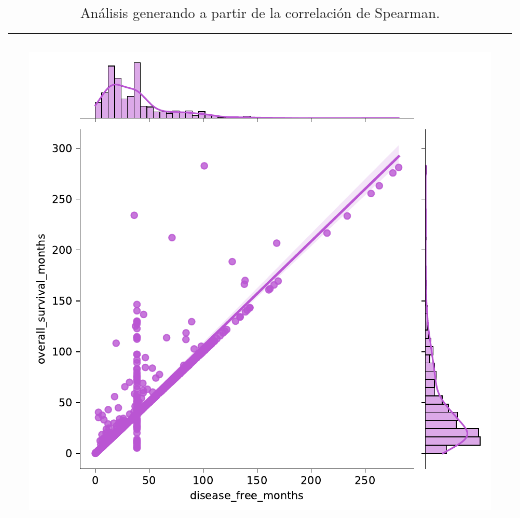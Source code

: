 \begin{table}[htb!]
\begin{threeparttable}
\begin{tabular}{p{0.5cm} p{7cm} p{6.5cm}}
			& \begin{center}\includegraphics[width=1\linewidth]{NOTEBOOK/IMAGENES_CORRELACION/reg_disease_free_months_overall_survival_months}\end{center}
			\\ \hline
		\end{tabular}
		\caption{Análisis generando a partir de la correlación de Spearman.}
		\label{analisis_correlacion}
	\end{threeparttable}
\end{table}
